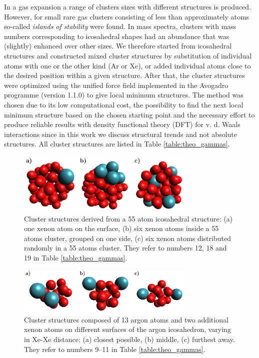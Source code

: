 \documentclass[journal=jpccck,manuscript=article]{achemso}
\begin{document}
In a gas expansion a range of clusters sizes with different structures is produced. 
However, for small rare gas clusters consisting of less than approximately \unit[1000]{atoms} so-called \emph{islands of stability} were found.\cite{haberland}  
In mass spectra, clusters with mass numbers corresponding to icosahedral shapes had an abundance that was (slightly) enhanced over other sizes. 
We therefore started from icosahedral structures and constructed mixed cluster structures by substitution of individual atoms with one or the other kind (Ar or Xe), or added individual atoms close to the desired position within a given structure. 
After that, the cluster structures were optimized using the unified force
field implemented in the 
Avogadro programme (version 1.1.0) \cite{Avogadro,Hanwell12} to give local
minimum structures. The method was chosen due to its low computational cost,
the possibility to find the next local minimum structure based on the chosen
starting point and the necessary effort to produce reliable results
with density functional theory (DFT) for
v. d. Waals interactions since in this work we discuss structural trends and
not absolute structures.
All cluster structures are listed in Table \ref{table:theo_gammas}.
%
\begin{figure}[h]
 \centering
 \includegraphics[width=8.5cm]{cluster_3_overview.pdf}
 \caption{Cluster structures derived from a 55 atom icosahedral structure:
          (a) one xenon atom on the surface, (b) six xenon atoms inside a 55 atoms cluster,
          grouped on one side, (c) six xenon atoms distributed randomly
          in a 55 atoms cluster. They refer to numbers 12, 18 and 19
          in Table \ref{table:theo_gammas}.}
 \label{figure:cluster_3_overview}
\end{figure}
%
\begin{figure}[ht]
 \centering
 \includegraphics[width=8.5cm]{cluster_2_overview.pdf}
 \caption{Cluster structures composed of 13 argon atoms and two additional xenon
          atoms on different surfaces of the argon icosahedron, varying in Xe-Xe distance:
          (a) closest possible, (b) middle, (c) furthest away. They refer to
          numbers 9--11 in Table \ref{table:theo_gammas}.}
 \label{figure:cluster_2_overview}
\end{figure}
\end{document}
